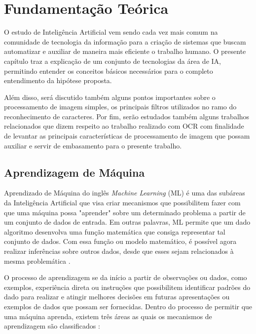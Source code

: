 \chapter[Fundamentação Teórica]{Fundamentação Teórica}

O estudo de Inteligência Artificial vem sendo cada vez mais comum na comunidade de tecnologia da informação para a criação de sistemas que buscam automatizar e auxiliar de maneira mais eficiente o trabalho humano. O presente capítulo traz a explicação de um conjunto de tecnologias da área de IA, permitindo entender os conceitos básicos necessários para o completo entendimento da hipótese proposta.

Além disso, será discutido também alguns pontos importantes sobre o processamento de imagem simples, os principais filtros utilizados no ramo do reconhecimento de caracteres. Por fim, serão estudados também alguns trabalhos relacionados que dizem respeito ao trabalho realizado com OCR com finalidade de levantar as principais características de processamento de imagem que possam auxiliar e servir de embasamento para o presente trabalho.

\section{Aprendizagem de Máquina}

Aprendizado de Máquina do inglês \textit{Machine Learning} (ML) é uma das subáreas da Inteligência Artificial que visa criar mecanismos que possibilitem fazer com que uma máquina possa "aprender" sobre um determinado problema a partir de um conjunto de dados de entrada. Em outras palavras, ML permite que um dado algoritmo desenvolva uma função matemática que consiga representar tal conjunto de dados. Com essa função ou modelo matemático, é possível agora realizar inferências sobre outros dados, desde que esses sejam relacionados à mesma problemática \cite{deep-learning-book-br}.

O processo de aprendizagem se da início a partir de observações ou dados, como exemplos, experiência direta ou instruções que possibilitem identificar padrões do dado para realizar e atingir melhores decisões em futuras apresentações ou exemplos de dados que possam ser fornecidas. Dentro do processo de permitir que uma máquina aprenda, existem três áreas as quais os mecanismos de aprendizagem são classificados \cite{python-ml}:

